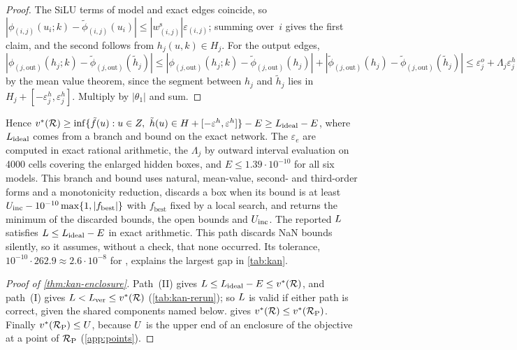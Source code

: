 \begin{proof}
The SiLU terms of model and exact edges coincide, so $|\phi_{(i,j)}(u_i;k)-\tilde\phi_{(i,j)}(u_i)|\le|w^{\mathrm s}_{(i,j)}|\varepsilon_{(i,j)}$; summing over~$i$ gives the first claim, and the second follows from $h_j(u,k)\in H_j$.
For the output edges, $|\phi_{(j,\mathrm{out})}(h_j;k)-\tilde\phi_{(j,\mathrm{out})}(\tilde h_j)|\le|\phi_{(j,\mathrm{out})}(h_j;k)-\tilde\phi_{(j,\mathrm{out})}(h_j)|+|\tilde\phi_{(j,\mathrm{out})}(h_j)-\tilde\phi_{(j,\mathrm{out})}(\tilde h_j)|\le\varepsilon^o_j+\Lambda_j\varepsilon^h_j$ by the mean value theorem, since the segment between $h_j$ and $\tilde h_j$ lies in $H_j+[-\varepsilon^h_j,\varepsilon^h_j]$.
Multiply by $|\theta_1|$ and sum.
\end{proof}

Hence $v^{*}(\mathcal{R})\ge\inf\{\tilde f(u):u\in Z,\ \tilde h(u)\in H+[-\varepsilon^h,\varepsilon^h]\}-E\ge L_{\mathrm{ideal}}-E$, where $L_{\mathrm{ideal}}$ comes from a branch and bound on the exact network.
The $\varepsilon_e$ are computed in exact rational arithmetic, the $\Lambda_j$ by outward interval evaluation on 4000 cells covering the enlarged hidden boxes, and $E\le1.39\cdot10^{-10}$ for all six models.
This branch and bound uses natural, mean-value, second- and third-order forms and a monotonicity reduction, discards a box when its bound is at least $U_{\mathrm{inc}}-10^{-10}\max\{1,|f_{\mathrm{best}}|\}$ with $f_{\mathrm{best}}$ fixed by a local search, and returns the minimum of the discarded bounds, the open bounds and $U_{\mathrm{inc}}$.
The reported $L$ satisfies $L\le L_{\mathrm{ideal}}-E$ in exact arithmetic.
This path discards NaN bounds silently, so it assumes, without a check, that none occurred.
Its tolerance, $10^{-10}\cdot262.9\approx2.6\cdot10^{-8}$ for , explains the largest gap in \cref{tab:kan}.

\begin{proof}[Proof of \cref{thm:kan-enclosure}]
Path~(II) gives $L\le L_{\mathrm{ideal}}-E\le v^{*}(\mathcal{R})$, and path~(I) gives $L<L_{\mathrm{ver}}\le v^{*}(\mathcal{R})$ (\cref{tab:kan-rerun}); so $L$ is valid if either path is correct, given the shared components named below.
 gives $v^{*}(\mathcal{R})\le v^{*}(\mathcal{R}_{\mathrm{P}})$.
Finally $v^{*}(\mathcal{R}_{\mathrm{P}})\le U$, because $U$ is the upper end of an enclosure of the objective at a point of $\mathcal{R}_{\mathrm{P}}$ (\cref{app:points}).
\end{proof}

